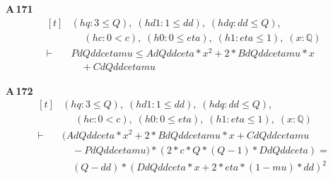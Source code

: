 \noindent\textbf{A\,171}\quad{}
{\footnotesize\[ \begin{aligned}[t]
&(\mathit{hq} : 3 \leq \mathit{Q}),\; (\mathit{hd1} : 1 \leq \mathit{dd}),\; (\mathit{hdq} : \mathit{dd} \leq \mathit{Q}),\\
&\quad \; (\mathit{hc} : 0 < \mathit{c}),\; (\mathit{h0} : 0 \leq \mathit{eta}),\; (\mathit{h1} : \mathit{eta} \leq 1),\; (\mathit{x} : \mathbb{Q} )\\
\vdash\;&\mathit{Pd} \mathit{Q} \mathit{dd} \mathit{c} \mathit{eta} \mathit{mu} \leq \mathit{Ad} \mathit{Q} \mathit{dd} \mathit{c} \mathit{eta} * \mathit{x} ^{2} + 2 * \mathit{Bd} \mathit{Q} \mathit{dd} \mathit{c} \mathit{eta} \mathit{mu} * \mathit{x}\\
&\quad + \mathit{Cd} \mathit{Q} \mathit{dd} \mathit{c} \mathit{eta} \mathit{mu}
\end{aligned} \]}

\noindent\textbf{A\,172}\quad{}
{\footnotesize\[ \begin{aligned}[t]
&(\mathit{hq} : 3 \leq \mathit{Q}),\; (\mathit{hd1} : 1 \leq \mathit{dd}),\; (\mathit{hdq} : \mathit{dd} \leq \mathit{Q}),\\
&\quad \; (\mathit{hc} : 0 < \mathit{c}),\; (\mathit{h0} : 0 \leq \mathit{eta}),\; (\mathit{h1} : \mathit{eta} \leq 1),\; (\mathit{x} : \mathbb{Q} )\\
\vdash\;&(\mathit{Ad} \mathit{Q} \mathit{dd} \mathit{c} \mathit{eta} * \mathit{x} ^{2} + 2 * \mathit{Bd} \mathit{Q} \mathit{dd} \mathit{c} \mathit{eta} \mathit{mu} * \mathit{x} + \mathit{Cd} \mathit{Q} \mathit{dd} \mathit{c} \mathit{eta} \mathit{mu}\\
&\quad - \mathit{Pd} \mathit{Q} \mathit{dd} \mathit{c} \mathit{eta} \mathit{mu}) * (2 * \mathit{c} * \mathit{Q} * (\mathit{Q} - 1) * \mathit{Dd} \mathit{Q} \mathit{dd} \mathit{c} \mathit{eta}) =\\
&\quad (\mathit{Q} - \mathit{dd}) * (\mathit{Dd} \mathit{Q} \mathit{dd} \mathit{c} \mathit{eta} * \mathit{x} + 2 * \mathit{eta} * (1 - \mathit{mu}) * \mathit{dd}) ^{2}
\end{aligned} \]}

